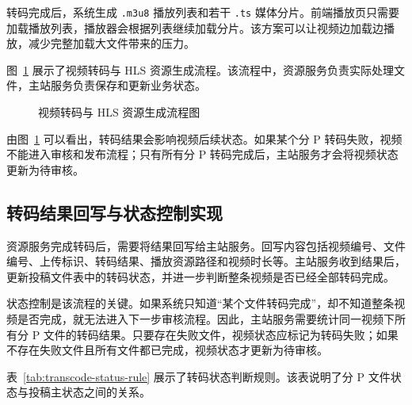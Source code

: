 转码完成后，系统生成 \texttt{.m3u8} 播放列表和若干 \texttt{.ts} 媒体分片。前端播放页只需要加载播放列表，播放器会根据列表继续加载分片。该方案可以让视频边加载边播放，减少完整加载大文件带来的压力。

图~\ref{fig:transcode-flow} 展示了视频转码与 HLS 资源生成流程。该流程中，资源服务负责实际处理文件，主站服务负责保存和更新业务状态。

\begin{figure}[htbp]
  \centering
  \caption{视频转码与 HLS 资源生成流程图}
  \label{fig:transcode-flow}
\end{figure}

由图~\ref{fig:transcode-flow} 可以看出，转码结果会影响视频后续状态。如果某个分 P 转码失败，视频不能进入审核和发布流程；只有所有分 P 转码完成后，主站服务才会将视频状态更新为待审核。

\subsection{转码结果回写与状态控制实现}
\label{subsec:transcode-status-implementation}

资源服务完成转码后，需要将结果回写给主站服务。回写内容包括视频编号、文件编号、上传标识、转码结果、播放资源路径和视频时长等。主站服务收到结果后，更新投稿文件表中的转码状态，并进一步判断整条视频是否已经全部转码完成。

状态控制是该流程的关键。如果系统只知道“某个文件转码完成”，却不知道整条视频是否完成，就无法进入下一步审核流程。因此，主站服务需要统计同一视频下所有分 P 文件的转码结果。只要存在失败文件，视频状态应标记为转码失败；如果不存在失败文件且所有文件都已完成，视频状态才更新为待审核。

表~\ref{tab:transcode-status-rule} 展示了转码状态判断规则。该表说明了分 P 文件状态与投稿主状态之间的关系。

